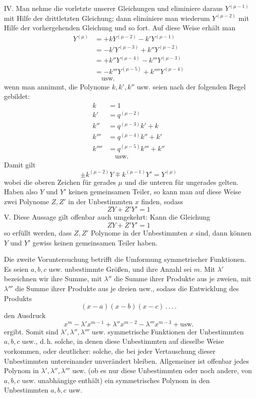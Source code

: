 IV. Man nehme die vorletzte unserer Gleichungen und eliminiere daraus $Y^{(\mu-1)}$ mit Hilfe der drittletzten Gleichung; dann eliminiere man wiederum $Y^{(\mu-2)}$ mit Hilfe der vorhergehenden Gleichung und so fort. Auf diese Weise erhält man
\[
\begin{aligned}
Y^{(\mu)}&=+kY^{(\mu-2)}-k'Y^{(\mu-1)}\\
&=-k'Y^{(\mu-3)}+k''Y^{(\mu-2)}\\
&=+k''Y^{(\mu-4)}-k'''Y^{(\mu-3)}\\
&=-k'''Y^{(\mu-5)}+k''''Y^{(\mu-4)}\\
&\quad\text{usw.}
\end{aligned}
\]
wenn man annimmt, die Polynome $k,k',k''$ usw. seien nach der folgenden Regel gebildet:
\[
\begin{aligned}
k&=1\\
k'&=q^{(\mu-2)}\\
k''&=q^{(\mu-3)}k'+k\\
k'''&=q^{(\mu-4)}k''+k'\\
k''''&=q^{(\mu-5)}k'''+k''\\
&\quad\text{usw.}
\end{aligned}
\]
Damit gilt
\[
\pm k^{(\mu-2)}Y\mp k^{(\mu-1)}Y'=Y^{(\mu)}
\]
wobei die oberen Zeichen für gerades $\mu$ und die unteren für ungerades gelten. Haben also $Y$ und $Y'$ keinen gemeinsamen Teiler, so kann man auf diese Weise zwei Polynome $Z,Z'$ in der Unbestimmten $x$ finden, sodass
\[
ZY+Z'Y'=1
\]
V. Diese Aussage gilt offenbar auch umgekehrt: Kann die Gleichung
\[
ZY+Z'Y'=1
\]
so erfüllt werden, dass $Z,Z'$ Polynome in der Unbestimmten $x$ sind, dann können $Y$ und $Y'$ gewiss keinen gemeinsamen Teiler haben.

Die zweite Voruntersuchung betrifft die Umformung symmetrischer Funktionen. Es seien $a,b,c$ usw. unbestimmte Größen, und ihre Anzahl sei $m$. Mit $\lambda'$ bezeichnen wir ihre Summe, mit $\lambda''$ die Summe ihrer Produkte aus je zweien, mit $\lambda'''$ die Summe ihrer Produkte aus je dreien usw., sodass die Entwicklung des Produkts
\[
(x-a)(x-b)(x-c)\, .\, .\, .\, .
\]
den Ausdruck
\[
x^m-\lambda'x^{m-1}+\lambda''x^{m-2}-\lambda'''x^{m-3}+\text{usw.}
\]
ergibt. Somit sind $\lambda',\lambda'',\lambda'''$ usw. symmetrische Funktionen der Unbestimmten $a,b,c$ usw., d.\,h. solche, in denen diese Unbestimmten auf dieselbe Weise vorkommen, oder deutlicher: solche, die bei jeder Vertauschung dieser Unbestimmten untereinander unverändert bleiben. Allgemeiner ist offenbar jedes Polynom in $\lambda',\lambda'',\lambda'''$ usw. (ob es nur diese Unbestimmten oder noch andere, von $a,b,c$ usw. unabhängige enthält) ein symmetrisches Polynom in den Unbestimmten $a,b,c$ usw.

